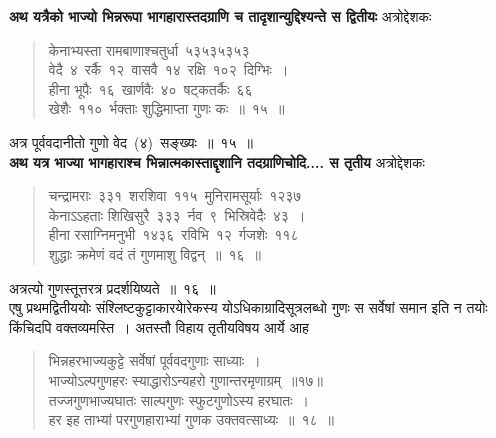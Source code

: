 \documentclass[11pt, openany]{book}
\begin{document}
\indent
\textbf{अथ यत्रैको भाज्यो भिन्नरूपा भागहारास्तदग्राणि च तादृशान्युद्दिश्यन्ते स द्वितीयः\textendash} अत्रोद्देशकः\textendash
\begin{quote}
{\ku केनाभ्यस्ता रामबाणाश्चतुर्धा~५३\textendash५३\textendash५३\textendash५३\\
वेदै~४~रर्कै~१२~वासवै~१४~रक्षि~१०२~दिग्भिः~।\\
हीना भूपैः~१६~खार्णवैः~४०~षट्कतर्कैः~६६\\
खेशैः~११०~र्भक्ताः शुद्धिमाप्ता गुणः कः~॥~१५~॥}
\end{quote}

अत्र पूर्ववदानीतो गुणो वेद~(४)~सङ्ख्यः~॥~१५~॥\\

\textbf{अथ यत्र भाज्या भागहाराश्च भिन्नात्मकास्ताद्दृशानि तदग्राणिचोदि.... स तृतीय\textendash} अत्रोद्देशकः\textendash

\newpage
\thispagestyle{fancy}
\fancyhf{}

\begin{quote}
{\ku चन्द्रामराः~३३१~शरशिवा~११५~मुनिरामसूर्याः~१२३७\\
केनाऽऽहताः शिखिसुरै~३३३~र्नव~९~भिस्रिवेदैः~४३~।\\
हीना रसाग्निमनुभी~१४३६~रविभि~१२~र्गजशेः~११८\\
शुद्धाः क्रमेणं वदं तं गुणमाशु विद्वन्~॥~१६~॥}
\end{quote}
\indent
अत्रत्यो गुणस्तूत्तरत्र प्रदर्शयिष्यते~॥~१६~॥\\
\indent
एषु प्रथमद्वितीययोः संश्लिष्टकुट्टाकारयाेरेकस्य योऽधिकाग्रादिसूत्रलब्धो गुणः स सर्वेषां समान इति न तयोः किंचिदपि वक्तव्यमस्ति~। अतस्तौ विहाय तृतीयविषय आर्ये आह\textendash
\begin{quote}
{\ks भिन्नहरभाज्यकुट्टे सर्वेषां पूर्ववदगुणाः साध्याः~।\\
भाज्योऽल्पगुणहरः स्याद्धारोऽन्यहरो गुणान्तरमृणाग्रम्~॥१७॥\\
तज्जगुणभाज्यघातः साल्पगुणः स्फुटगुणोऽस्य हरघातः~।\\
हर इह ताभ्यां परगुणहाराभ्यां गुणक उक्तवत्साध्यः~॥~१८~॥}
\end{quote}
\end{document}
